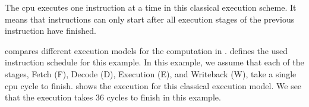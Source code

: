 The \ac{cpu} executes one instruction at a time in this classical execution scheme.
It means that instructions can only start after all execution stages of the previous instruction have finished.

 compares different execution models for the computation in .
 defines the used instruction schedule for this example.
In this example, we assume that each of the stages, Fetch (F), Decode (D), Execution (E), and Writeback (W), take a single \ac{cpu} cycle to finish.
 shows the execution for this classical execution model.
We see that the execution takes 36 cycles to finish in this example.

